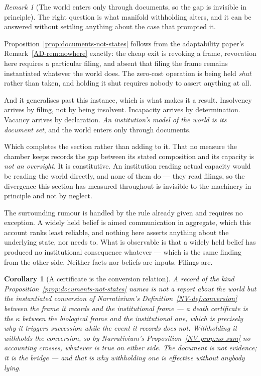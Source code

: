 \documentclass[11pt,a4paper]{article}
\newtheorem{corollary}[definition]{Corollary}
\theoremstyle{remark}
\newtheorem{remark}[definition]{Remark}
\begin{document}
\begin{remark}[The world enters only through documents, so the gap is invisible in principle]\label{rem:document}
The right question is what manifold withholding alters, and it can be answered without settling
anything about the case that prompted it.

Proposition~\ref{prop:documents-not-states} follows from the adaptability paper's
Remark~\ref{AD-rem:nowhere} exactly: the cheap exit is revoking a frame, revocation here requires a
particular filing, and absent that filing the frame remains instantiated whatever the world does. The
zero-cost operation is being held \emph{shut} rather than taken, and holding it shut requires nobody to
assert anything at all.

And it generalises past this instance, which is what makes it a result. Insolvency arrives by
filing, not by being insolvent. Incapacity arrives by determination. Vacancy arrives by declaration.
\emph{An institution's model of the world is its document set}, and the world enters only through
documents.

Which completes the section rather than adding to it. That no measure the chamber keeps records
the gap between its stated composition and its capacity is \emph{not an oversight}. It is constitutive.
An institution reading actual capacity would be reading the world directly, and none of them do ---
they read filings, so the divergence this section has measured throughout is invisible to the
machinery in principle and not by neglect.

The surrounding rumour is handled by the rule already given and requires no exception. A widely
held belief is aimed communication in aggregate, which this account ranks least reliable, and
nothing here asserts anything about the underlying state, nor needs to. What is observable is
that a widely held belief has produced no institutional consequence whatever --- which is the same
finding from the other side. Neither facts nor beliefs are inputs. Filings are.
\end{remark}

\begin{corollary}[A certificate is the conversion relation]\label{cor:certificate-conversion}
A record of the kind Proposition~\ref{prop:documents-not-states} names is not a report about the world
but the instantiated conversion of \emph{Narrativium}'s Definition~\ref{NV-def:conversion} between the
frame it records and the institutional frame --- a death certificate is the $\kappa$ between the
biological frame and the institutional one, which is precisely
why it triggers succession while the event it records does not. Withholding it withholds the conversion,
so by \emph{Narrativium}'s Proposition~\ref{NV-prop:no-sum} no accounting crosses, whatever is true on
either side. The document is not evidence; it is the bridge --- and that is why withholding one is
effective without anybody lying.
\end{corollary}
\end{document}
